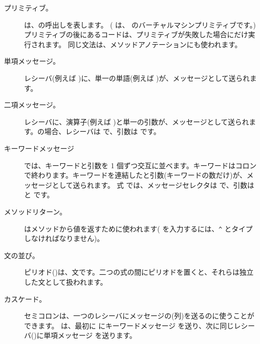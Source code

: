 \documentclass[a4paper,10pt,twoside]{book}
\begin{document}
\begin{description}
\item[プリミティブ。] は、の呼出しを表します。
	( は、 のバーチャルマシンプリミティブです。)
	プリミティブの後にあるコードは、プリミティブが失敗した場合にだけ実行されます。
	同じ文法は、メソッドアノテーションにも使われます。

\item[単項メッセージ。] レシーバ(例えば )に、単一の単語(例えば )が、メッセージとして送られます。

\item[二項メッセージ。] レシーバに、演算子(例えば \ct{+})と単一の引数が、メッセージとして送られます。の場合、レシーバは  で、引数は  です。

\item[キーワードメッセージ] では、キーワードと引数を 1 個ずつ交互に並べます。キーワードはコロンで終わります。キーワードを連結したと引数(キーワードの数だけ)が、メッセージとして送られます。
式  では、メッセージセレクタは  で、引数は  と  です。

\item[メソッドリターン。] \ct{^}はメソッドから値を返すために使われます(\ct{^} を入力するには、\verb|^| とタイプしなければなりません)。

\item[文の並び。] ピリオド()は、文です。二つの式の間にピリオドを置くと、それらは独立した文として扱われます。

\item[カスケード。] セミコロンは、一つのレシーバにメッセージの(列)を送るのに使うことができます。 は、最初に  にキーワードメッセージ  を送り、次に同じレシーバ()に単項メッセージ  を送ります。

\end{description}
\end{document}
